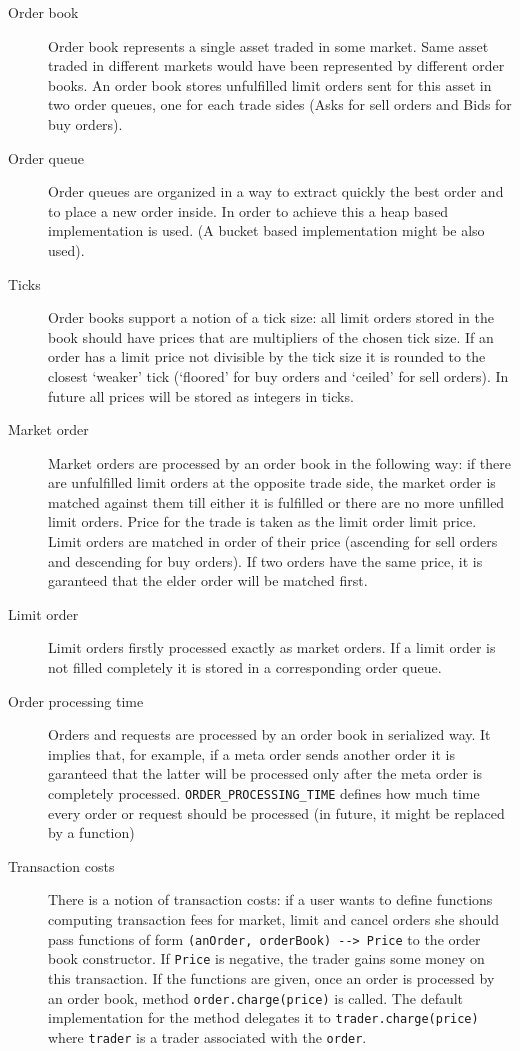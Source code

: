 \documentclass[a4paper,11pt]{article}
\begin{document}
\begin{description}
\item[Order book]
Order book represents a single asset traded in some market. Same asset
traded in different markets would have been represented by different
order books. An order book stores unfulfilled limit orders sent for this
asset in two order queues, one for each trade sides (Asks for sell
orders and Bids for buy orders).
\item[Order queue]
Order queues are organized in a way to extract quickly the best order
and to place a new order inside. In order to achieve this a heap based
implementation is used. (A bucket based implementation might be also
used).
\item[Ticks]
Order books support a notion of a tick size: all limit orders stored in
the book should have prices that are multipliers of the chosen tick
size. If an order has a limit price not divisible by the tick size it is
rounded to the closest `weaker' tick (`floored' for buy orders and
`ceiled' for sell orders). In future all prices will be stored as
integers in ticks.
\item[Market order]
Market orders are processed by an order book in the following way: if
there are unfulfilled limit orders at the opposite trade side, the
market order is matched against them till either it is fulfilled or
there are no more unfilled limit orders. Price for the trade is taken as
the limit order limit price. Limit orders are matched in order of their
price (ascending for sell orders and descending for buy orders). If two
orders have the same price, it is garanteed that the elder order will be
matched first.
\item[Limit order]
Limit orders firstly processed exactly as market orders. If a limit
order is not filled completely it is stored in a corresponding order
queue.
\item[Order processing time]
Orders and requests are processed by an order book in serialized way. It
implies that, for example, if a meta order sends another order it is
garanteed that the latter will be processed only after the meta order is
completely processed. \texttt{ORDER\_PROCESSING\_TIME} defines how much
time every order or request should be processed (in future, it might be
replaced by a function)
\item[Transaction costs]
There is a notion of transaction costs: if a user wants to define
functions computing transaction fees for market, limit and cancel orders
she should pass functions of form
\texttt{(anOrder, orderBook) -{}-\textgreater{} Price} to the order book
constructor. If \texttt{Price} is negative, the trader gains some money
on this transaction. If the functions are given, once an order is
processed by an order book, method \texttt{order.charge(price)} is
called. The default implementation for the method delegates it to
\texttt{trader.charge(price)} where \texttt{trader} is a trader
associated with the \texttt{order}.
\end{description}
\end{document}
